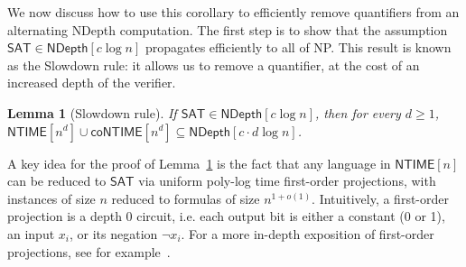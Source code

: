 \documentclass[a4paper, 11pt]{article}
\theoremstyle{plain}
\newtheorem{lemma}[theorem]{Lemma}
\theoremstyle{definition}
\theoremstyle{remark}
\newcommand{\NP}{\textsf{NP}}%
\newcommand{\NTIME}{\textsf{NTIME}}%
\newcommand{\coNTIME}{\textsf{coNTIME}}%
\newcommand{\SAT}{\textsf{SAT}}%
\newcommand{\ND}{\textsf{NDepth}}%
\newcommand{\NDL}[1]{\ND\left[ #1 \log n\right]}%
\begin{document}
We now discuss how to use this corollary to
efficiently remove quantifiers from an alternating \ND{} computation.
The first step is to show that the assumption $\SAT\in\NDL{c}$
propagates efficiently to all of \NP{}.
This result is known as the Slowdown rule: it allows us to remove a quantifier,
at the cost of an increased depth of the verifier.
\begin{lemma}[Slowdown rule]\label{lemma:slowdown}
	If $\SAT{}\in \NDL{c}$, then for every $d \ge 1$, $\NTIME[n^d] \cup \coNTIME[n^d] \subseteq \NDL{c\cdot d}$.
\end{lemma}

A key idea for the proof of Lemma~\ref{lemma:slowdown} 
is the fact that any language in $\NTIME[n]$ can
be reduced to $\SAT{}$ via uniform poly-log time first-order projections, 
with instances of size $n$ reduced to formulas of size $n^{1+o(1)}$.
Intuitively, a first-order projection is a depth 0 circuit, 
i.e. each output bit is either a constant (0 or 1),
an input $x_i$, or its negation $\neg x_i$.
For a more in-depth exposition of first-order projections,
see for example~\cite[End of Sec.~3]{allender1997first}.
\end{document}
